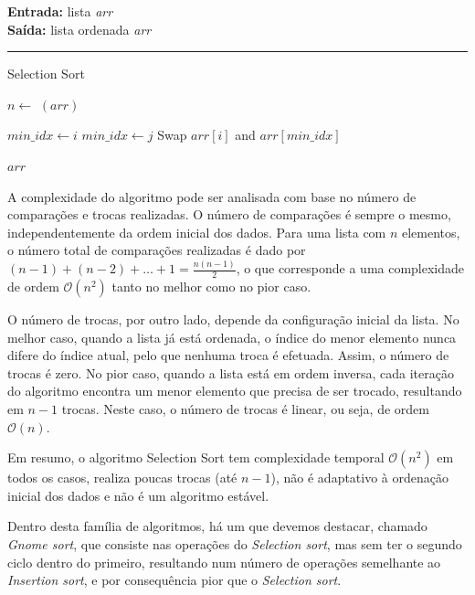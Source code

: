 \documentclass[conference]{IEEEtran}
\begin{document}
\begin{algorithm}[H]
    \raggedright
    \vspace{.1em}
    \textbf{Entrada:} lista \textit{arr} \\
    \textbf{Saída:} lista ordenada \textit{arr} \\
    \vspace{.5em}
    \hrule 
    \caption{Selection Sort}
    \begin{algorithmic}[1]
        \State $n \gets$ $(arr)$
    
            \State $min\_idx \gets i$
                    \State $min\_idx \gets j$
                \EndIf
            \EndFor
                \State Swap $arr[i]$ and $arr[min\_idx]$
            \EndIf
        \EndFor
    
        \State \Return $arr$
    \end{algorithmic}
\end{algorithm}

A complexidade do algoritmo pode ser analisada com base no número de comparações e trocas realizadas. O número de comparações é sempre o mesmo, independentemente da ordem inicial dos dados. Para uma lista com \( n \) elementos, o número total de comparações realizadas é dado por \((n-1) + (n-2) + \ldots + 1 = \frac{n(n-1)}{2}\), o que corresponde a uma complexidade de ordem \(\mathcal{O}(n^2)\) tanto no melhor como no pior caso.

O número de trocas, por outro lado, depende da configuração inicial da lista. No melhor caso, quando a lista já está ordenada, o índice do menor elemento nunca difere do índice atual, pelo que nenhuma troca é efetuada. Assim, o número de trocas é zero. No pior caso, quando a lista está em ordem inversa, cada iteração do algoritmo encontra um menor elemento que precisa de ser trocado, resultando em \(n - 1\) trocas. Neste caso, o número de trocas é linear, ou seja, de ordem \(\mathcal{O}(n)\).

Em resumo, o algoritmo Selection Sort tem complexidade temporal \(\mathcal{O}(n^2)\) em todos os casos, realiza poucas trocas (até \(n-1\)), não é adaptativo à ordenação inicial dos dados e não é um algoritmo estável.


Dentro desta família de algoritmos, há um que devemos destacar, chamado \textit{Gnome sort},  que consiste nas operações do \textit{Selection sort}, mas sem ter o segundo ciclo dentro do primeiro, resultando num número de operações semelhante ao \textit{Insertion sort}, e por consequência pior que o \textit{Selection sort}.
\end{document}
